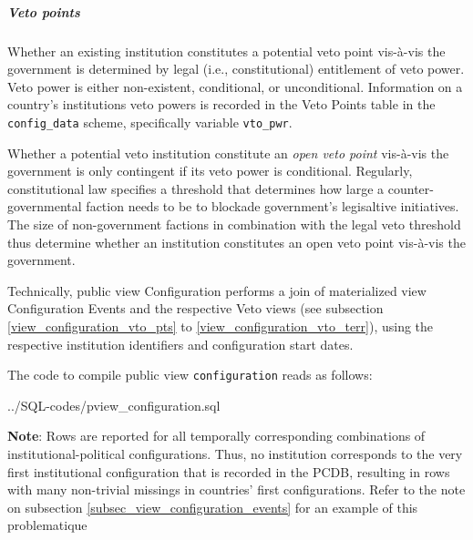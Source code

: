 \subparagraph{Veto points}
Whether an existing institution constitutes a potential veto point vis-\`a-vis the government is determined by legal (i.e., constitutional) entitlement of veto power. Veto power is either non-existent, conditional, or unconditional. Information on a country's institutions veto powers is recorded in the Veto Points table in the \texttt{\footnotesize config\_data} scheme, specifically variable \texttt{\footnotesize vto\_pwr}.

Whether a potential veto institution constitute an \emph{open veto point} vis-\`a-vis the government is only contingent if its veto power is conditional. Regularly, constitutional law specifies a threshold that determines how large a counter-governmental faction needs to be to blockade government's legisaltive initiatives. 
The size of non-government factions in combination with the legal veto threshold thus determine whether an institution constitutes an open veto point vis-\`a-vis the government.

Technically, public view Configuration performs a join of materialized view Configuration Events and the respective Veto views (see subsection \ref{view_configuration_vto_pts} to \ref{view_configuration_vto_terr}), using the respective institution identifiers and configuration start dates.

The code to compile public view \texttt{\footnotesize configuration} reads as follows:

%
{../SQL-codes/pview_configuration.sql}


{\bf Note}: Rows are reported for all temporally corresponding combinations of institutional-political configurations. Thus, no institution corresponds to the very first institutional configuration that is recorded in the PCDB, resulting in rows with many non-trivial missings in countries' first configurations. Refer to the note on subsection \ref{subsec_view_configuration_events} for an example of this problematique
